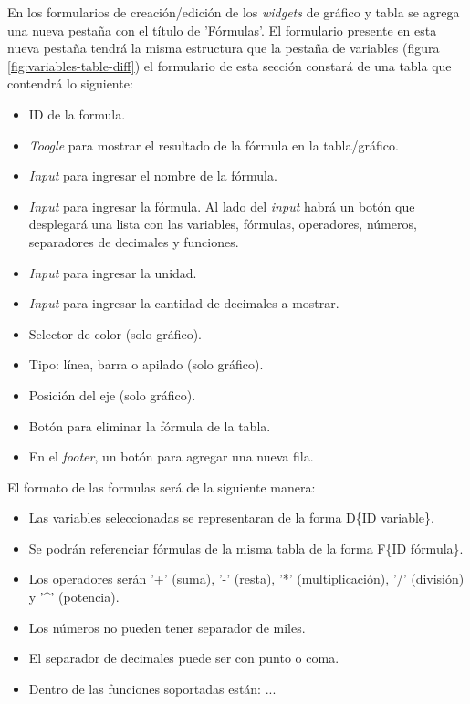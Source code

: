 En los formularios de creación/edición de los \textit{widgets} de gráfico y tabla se agrega una nueva pestaña con el título de 'Fórmulas'. El formulario presente en esta nueva pestaña tendrá la misma estructura que la pestaña de variables (figura \ref{fig:variables-table-diff}) el formulario de esta sección constará de una tabla que contendrá lo siguiente:
\begin{itemize}
    \item ID de la formula.
    \item \textit{Toogle} para mostrar el resultado de la fórmula en la tabla/gráfico.
    \item \textit{Input} para ingresar el nombre de la fórmula.
    \item \textit{Input} para ingresar la fórmula. Al lado del \textit{input} habrá un botón que desplegará una lista con las variables, fórmulas, operadores, números, separadores de decimales y funciones.
    \item \textit{Input} para ingresar la unidad.
    \item \textit{Input} para ingresar la cantidad de decimales a mostrar.
    \item Selector de color (solo gráfico).
    \item Tipo: línea, barra o apilado (solo gráfico).
    \item Posición del eje (solo gráfico).
    \item Botón para eliminar la fórmula de la tabla.
    \item En el \textit{footer}, un botón para agregar una nueva fila.
\end{itemize}

El formato de las formulas será de la siguiente manera:
\begin{itemize}
    \item Las variables seleccionadas se representaran de la forma D\{ID variable\}.
    \item Se podrán referenciar fórmulas de la misma tabla de la forma F\{ID fórmula\}.
    \item Los operadores serán '+' (suma), '-' (resta), '*' (multiplicación), '/' (división) y '\^{}' (potencia).
    \item Los números no pueden tener separador de miles.
    \item El separador de decimales puede ser con punto o coma.
    \item Dentro de las funciones soportadas están: ...
\end{itemize}


